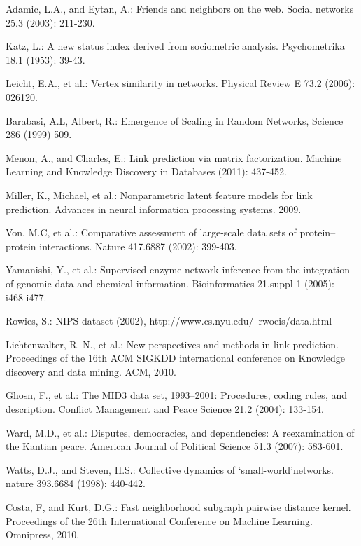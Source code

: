 \documentclass[runningheads,a4paper]{llncs}
\begin{document}
\begin{thebibliography}{4}

 Adamic, L.A., and Eytan, A.: Friends and neighbors on the web. Social networks 25.3 (2003): 211-230.

 Katz, L.: A new status index derived from sociometric analysis. Psychometrika 18.1 (1953): 39-43.

 Leicht, E.A., et al.: Vertex similarity in networks. Physical Review E 73.2 (2006): 026120.

  Barabasi, A.L, Albert, R.: Emergence of Scaling in Random Networks, Science 286 (1999) 509.

 Menon, A., and Charles, E.: Link prediction via matrix factorization. Machine Learning and Knowledge Discovery in Databases (2011): 437-452.

 Miller, K., Michael, et al.: Nonparametric latent feature models for link prediction. Advances in neural information processing systems. 2009.

 Von. M.C, et al.: Comparative assessment of large-scale data sets of protein–protein interactions. Nature 417.6887 (2002): 399-403.

 Yamanishi, Y., et al.: Supervised enzyme network inference from the integration of genomic data and chemical information. Bioinformatics 21.suppl-1 (2005): i468-i477.

 Rowies, S.: NIPS dataset (2002), http://www.cs.nyu.edu/~rwoeis/data.html

 Lichtenwalter, R. N., et al.: New perspectives and methods in link prediction. Proceedings of the 16th ACM SIGKDD international conference on Knowledge discovery and data mining. ACM, 2010.

 Ghosn, F., et al.: The MID3 data set, 1993–2001: Procedures, coding rules, and description. Conflict Management and Peace Science 21.2 (2004): 133-154.

 Ward, M.D., et al.: Disputes, democracies, and dependencies: A reexamination of the Kantian peace. American Journal of Political Science 51.3 (2007): 583-601.

 Watts, D.J., and Steven, H.S.: Collective dynamics of ‘small-world’networks. nature 393.6684 (1998): 440-442.

 Costa, F, and Kurt, D.G.: Fast neighborhood subgraph pairwise distance kernel. Proceedings of the 26th International Conference on Machine Learning. Omnipress, 2010.


\end{thebibliography}
\end{document}

